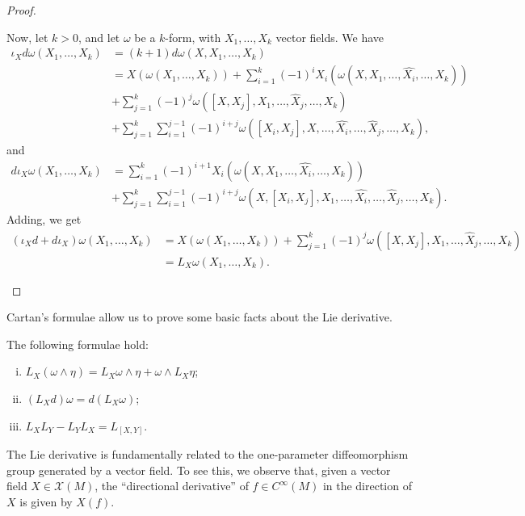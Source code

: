 \documentclass[10pt]{mypackage}
\begin{document}
\begin{proof}
\begin{enumerate}[(i)]
      Now, let $k > 0$, and let $\omega$ be a $k$-form, with $X_1,\dots,X_k$ vector fields. We have
      \begin{align*}
        \iota_Xd\omega\left( X_1,\dots,X_k \right) &= \left( k+1 \right)d\omega\left( X,X_1,\dots,X_k \right)\\
                                                   &= X\left( \omega\left( X_1,\dots,X_k \right) \right) + \sum_{i=1}^{k} \left( -1 \right)^{i} X_i\left( \omega\left( X,X_1,\dots,\widehat{X_i},\dots,X_k \right) \right)\\
                                                   &+ \sum_{j=1}^{k} \left( -1 \right)^{j} \omega\left( \left[ X,X_j \right],X_1,\dots,\widehat{X}_j,\dots,X_k \right)\\
                                                   &+ \sum_{j=1}^{k}\sum_{i=1}^{j-1} \left( -1 \right)^{i+j}\omega\left( \left[ X_i,X_j \right],X,\dots,\widehat{X_i},\dots,\widehat{X}_j,\dots,X_k \right),
      \end{align*}
      and
      \begin{align*}
        d\iota_X \omega\left( X_1,\dots,X_k \right) &= \sum_{i=1}^{k} \left( -1 \right)^{i+1}X_i\left( \omega\left( X,X_1,\dots,\widehat{X_i},\dots,X_k \right) \right)\\
                                                    &+ \sum_{j=1}^{k}\sum_{i=1}^{j-1}\left( -1 \right)^{i+j} \omega\left( X,\left[ X_i,X_j \right],X_1,\dots,\widehat{X_i},\dots,\widehat{X}_j,\dots,X_k \right).
      \end{align*}
      Adding, we get
      \begin{align*}
        \left( \iota_Xd + d\iota_X \right)\omega\left( X_1,\dots,X_k \right) &= X\left( \omega\left( X_1,\dots,X_k \right) \right) + \sum_{j=1}^{k}\left( -1 \right)^{j} \omega\left( \left[ X,X_j \right],X_1,\dots,\widehat{X}_j,\dots,X_k \right)\\
                                                                             &= L_X\omega\left( X_1,\dots,X_k \right).
      \end{align*}
  \end{enumerate}
\end{proof}
Cartan's formulae allow us to prove some basic facts about the Lie derivative.
\begin{proposition}
  The following formulae hold:
  \begin{enumerate}[(i)]
    \item $L_X\left( \omega\wedge\eta \right) = L_X\omega\wedge\eta + \omega\wedge L_X\eta$;
    \item $\left( L_X d \right)\omega = d\left( L_X\omega \right)$;
    \item $L_XL_Y - L_YL_X = L_{\left[ X,Y \right]}$.
  \end{enumerate}
\end{proposition}
The Lie derivative is fundamentally related to the one-parameter diffeomorphism group generated by a vector field. To see this, we observe that, given a vector field $X\in \mathcal{X}\left( M \right)$, the ``directional derivative'' of $f\in C^{\infty}\left( M \right)$ in the direction of $X$ is given by $X(f)$.\newline
\end{document}
